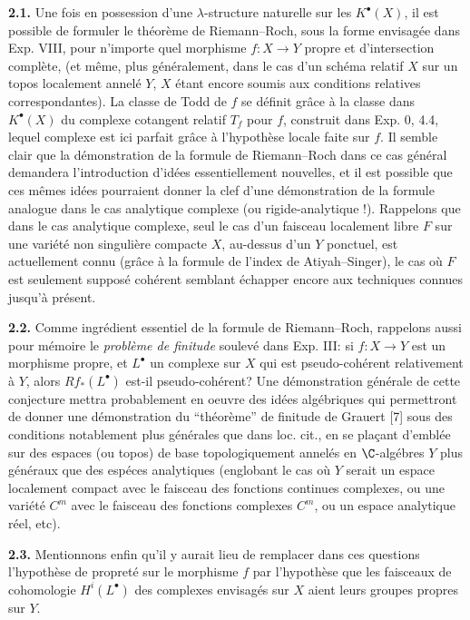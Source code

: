 \textbf{2.1.} Une fois en possession d'une $\lambda$-structure naturelle sur les $K^\bullet(X)$, il est possible de formuler le théorème de Riemann--Roch, sous la forme envisagée dans Exp. VIII, pour n'importe quel morphisme $f:X\to Y$ propre et d'intersection complète, (et même, plus généralement, dans le cas d'un schéma relatif $X$ sur un topos localement annelé $Y$, $X$ étant encore soumis aux conditions relatives correspondantes). La classe de Todd de $f$ se définit grâce à la classe dans $K^\bullet(X)$ du complexe cotangent relatif $T_f$ pour $f$, construit dans Exp. 0, 4.4, lequel complexe est ici parfait grâce à l'hypothèse locale faite sur $f$. Il semble clair que la démonstration de la formule de Riemann--Roch dans ce cas général demandera l'introduction d'idées essentiellement nouvelles, et il est possible que ces mêmes idées pourraient donner la clef d'une
démonstration de la formule analogue dans le cas analytique complexe (ou rigide-analytique !). Rappelons que dans le cas analytique complexe, seul le cas d'un faisceau localement libre $F$ sur une variété non singulière compacte $X$, au-dessus d'un $Y$ ponctuel, est actuellement connu (grâce à la formule de l'index de Atiyah--Singer), le cas où $F$ est seulement supposé cohérent semblant échapper encore aux techniques connues jusqu'à présent.

\textbf{2.2.} Comme ingrédient essentiel de la formule de Riemann--Roch, rappelons aussi pour mémoire le \emph{problème de finitude} soulevé dans Exp. III: si $f:X\to Y$ est un morphisme propre, et $L^\bullet$ un complexe sur $X$ qui est pseudo-cohérent relativement à $Y$, alors $Rf_*(L^\bullet)$ est-il pseudo-cohérent? Une démonstration générale de cette conjecture mettra probablement en oeuvre des idées algébriques qui permettront de donner une démonstration du ``théorème'' de finitude de Grauert [7] sous des conditions notablement plus générales que dans loc. cit., en se plaçant d'emblée sur des espaces (ou topos) de base topologiquement annelés en $\C$-algébres $Y$ plus généraux que des espéces analytiques (englobant le cas où $Y$ serait un espace localement compact avec le faisceau des fonctions continues complexes, ou une variété $C^m$ avec le faisceau des fonctions complexes $C^m$, ou un espace analytique réel, etc).

\textbf{2.3.} Mentionnons enfin qu'il y aurait lieu de remplacer dans ces questions l'hypothèse de propreté sur le morphisme $f$ par l'hypothèse que les faisceaux de cohomologie $H^i(L^\bullet)$ des complexes envisagés sur $X$ aient leurs groupes propres sur $Y$.

